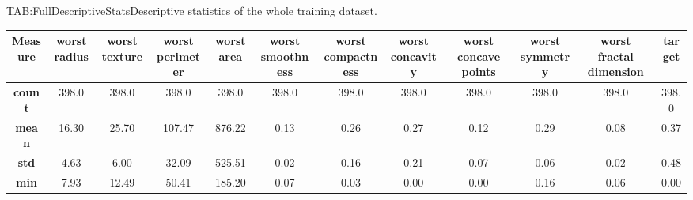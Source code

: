 \begin{landscape}
\begin{table}[Complete Descriptive Statistics]{TAB:FullDescriptiveStats}{Descriptive statistics of the whole training dataset.}
        \begin{adjustbox}{width=1\linewidth}
            \begin{tabular}{|c|*{11}{c|}}
                \hline
                \textbf{Measure} & \textbf{\bfseries worst radius} & \textbf{\bfseries worst texture} & \textbf{\bfseries worst perimeter} & \textbf{\bfseries worst area} & \textbf{\bfseries worst smoothness} & \textbf{\bfseries worst compactness} & \textbf{\bfseries worst concavity} & \textbf{\bfseries worst concave points} & \textbf{\bfseries worst symmetry} & \textbf{\bfseries worst fractal dimension} & \textbf{\bfseries target} \\
                \hline\hline
                \textbf{count}   & 398.0                           & 398.0                            & 398.0                              & 398.0                         & 398.0                               & 398.0                                & 398.0                              & 398.0                                   & 398.0                             & 398.0                                      & 398.0                     \\
                \hline
                \textbf{mean}    & 16.30                           & 25.70                            & 107.47                             & 876.22                        & 0.13                                & 0.26                                 & 0.27                               & 0.12                                    & 0.29                              & 0.08                                       & 0.37                      \\
                \hline
                \textbf{std}     & 4.63                            & 6.00                             & 32.09                              & 525.51                        & 0.02                                & 0.16                                 & 0.21                               & 0.07                                    & 0.06                              & 0.02                                       & 0.48                      \\
                \hline
                \textbf{min}     & 7.93                            & 12.49                            & 50.41                              & 185.20                        & 0.07                                & 0.03                                 & 0.00                               & 0.00                                    & 0.16                              & 0.06                                       & 0.00                      \\

\end{tabular}
\end{adjustbox}
\end{table}
\end{landscape}
